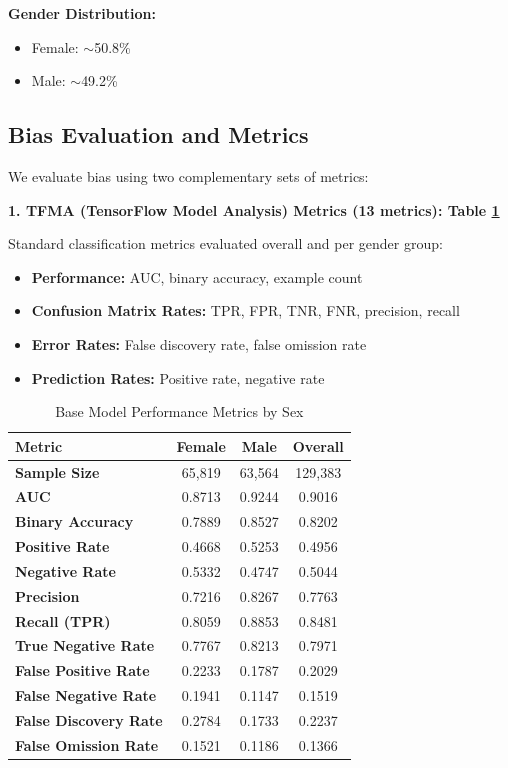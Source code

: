 \documentclass[11pt,a4paper]{article}
\begin{document}
\textbf{Gender Distribution:}
\begin{itemize}
    \item Female: $\sim$50.8\%
    \item Male: $\sim$49.2\%
\end{itemize}

\subsection{Bias Evaluation and Metrics}

We evaluate bias using two complementary sets of metrics:

\textbf{1. TFMA (TensorFlow Model Analysis) Metrics (13 metrics): Table \ref{tab:performance_by_sex_baseline}}

Standard classification metrics evaluated overall and per gender group:
\begin{itemize}
    \item \textbf{Performance:} AUC, binary accuracy, example count
    \item \textbf{Confusion Matrix Rates:} TPR, FPR, TNR, FNR, precision, recall
    \item \textbf{Error Rates:} False discovery rate, false omission rate
    \item \textbf{Prediction Rates:} Positive rate, negative rate
\end{itemize}

\begin{table}[h]
\centering
\caption{Base Model Performance Metrics by Sex}
\label{tab:performance_by_sex_baseline}
\begin{tabular}{|l|c|c|c|}
\hline
\textbf{Metric} & \textbf{Female} & \textbf{Male} & \textbf{Overall} \\
\hline
\textbf{Sample Size} & 65,819 & 63,564 & 129,383 \\
\hline
\textbf{AUC} & 0.8713 & 0.9244 & 0.9016 \\
\textbf{Binary Accuracy} & 0.7889 & 0.8527 & 0.8202 \\
\hline
\textbf{Positive Rate} & 0.4668 & 0.5253 & 0.4956 \\
\textbf{Negative Rate} & 0.5332 & 0.4747 & 0.5044 \\
\hline
\textbf{Precision} & 0.7216 & 0.8267 & 0.7763 \\
\textbf{Recall (TPR)} & 0.8059 & 0.8853 & 0.8481 \\
\textbf{True Negative Rate} & 0.7767 & 0.8213 & 0.7971 \\
\hline
\textbf{False Positive Rate} & 0.2233 & 0.1787 & 0.2029 \\
\textbf{False Negative Rate} & 0.1941 & 0.1147 & 0.1519 \\
\textbf{False Discovery Rate} & 0.2784 & 0.1733 & 0.2237 \\
\textbf{False Omission Rate} & 0.1521 & 0.1186 & 0.1366 \\
\hline
\end{tabular}
\end{table}
\end{document}
